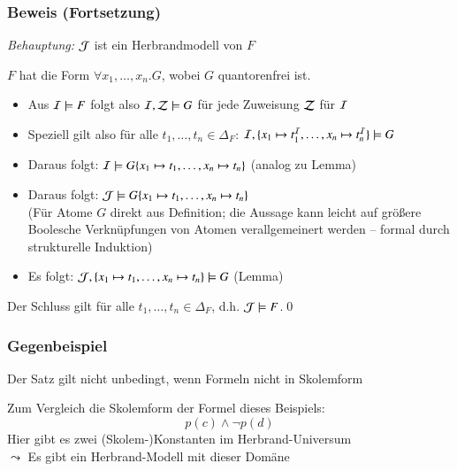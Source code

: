 \documentclass[aspectratio=1610,onlymath]{beamer}
\begin{document}
\begin{frame}\frametitle{Beweis (Fortsetzung)}

\emph{Behauptung:} \alert{$\mathcal{J}$ ist ein Herbrandmodell von $F$}\bigskip

$F$ hat die Form $\forall x_1,\ldots, x_n.G$, wobei $G$ quantorenfrei ist.\pause
\begin{itemize}
\item Aus $\mathcal{I}\models F$ folgt also $\mathcal{I},\mathcal{Z}\models G$ für jede Zuweisung $\mathcal{Z}$ für $\mathcal{I}$\pause
\item Speziell gilt also für alle $t_1,\ldots,t_n\in\Delta_F$: $\mathcal{I},\{x_1\mapsto t_1^{\mathcal{I}},\ldots,x_n\mapsto t_n^{\mathcal{I}}\}\models G$\pause
\item Daraus folgt: $\mathcal{I}\models G\{x_1\mapsto t_1,\ldots,x_n\mapsto t_n\}$  (analog zu Lemma)\pause
\item Daraus folgt: $\mathcal{J}\models G\{x_1\mapsto t_1,\ldots,x_n\mapsto t_n\}$\\
{\footnotesize(Für Atome $G$ direkt aus Definition; die Aussage kann leicht auf größere Boolesche Verknüpfungen von Atomen verallgemeinert werden -- formal durch strukturelle Induktion)}\pause
\item Es folgt: $\mathcal{J},\{x_1\mapsto t_1,\ldots,x_n\mapsto t_n\}\models G$ (Lemma)
\end{itemize}
Der Schluss gilt für alle $t_1,\ldots,t_n\in\Delta_F$, d.h. $\mathcal{J}\models F$.\qed

\end{frame}

\begin{frame}\frametitle{Gegenbeispiel}

Der Satz gilt nicht unbedingt, wenn Formeln nicht in Skolemform \bigskip


Zum Vergleich die Skolemform der Formel dieses Beispiels:
\[ p(c)\wedge\neg p(d)\]
Hier gibt es zwei (Skolem-)Konstanten im Herbrand-Universum\\
$\leadsto$ Es gibt ein Herbrand-Modell mit dieser Domäne

\end{frame}
\end{document}
